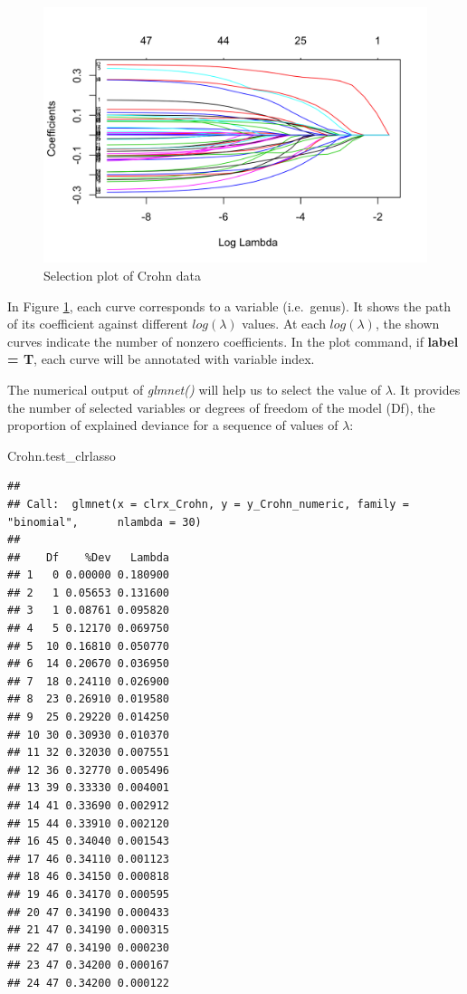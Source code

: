 \documentclass[openany]{book}
\newenvironment{Shaded}{\begin{snugshade}}{\end{snugshade}}
\newcommand{\NormalTok}[1]{#1}
\begin{document}
\begin{figure}

{\centering \includegraphics[width=1\linewidth]{./Generated_plots/CDlasso-1} 

}

\caption{Selection plot of Crohn data}\label{fig:CDlasso}
\end{figure}

In Figure \ref{fig:CDlasso}, each curve corresponds to a variable
(i.e.~genus). It shows the path of its coefficient against different
\(log(\lambda)\) values. At each \(log(\lambda)\), the shown curves
indicate the number of nonzero coefficients. In the plot command, if
\textbf{label = T}, each curve will be annotated with variable index.

The numerical output of \emph{glmnet()} will help us to select the value
of \(\lambda\). It provides the number of selected variables or degrees
of freedom of the model (Df), the proportion of explained deviance for a
sequence of values of \(\lambda\):

\begin{Shaded}
\begin{Highlighting}[]
\NormalTok{Crohn.test_clrlasso}
\end{Highlighting}
\end{Shaded}

\begin{verbatim}
## 
## Call:  glmnet(x = clrx_Crohn, y = y_Crohn_numeric, family = "binomial",      nlambda = 30) 
## 
##    Df    %Dev   Lambda
## 1   0 0.00000 0.180900
## 2   1 0.05653 0.131600
## 3   1 0.08761 0.095820
## 4   5 0.12170 0.069750
## 5  10 0.16810 0.050770
## 6  14 0.20670 0.036950
## 7  18 0.24110 0.026900
## 8  23 0.26910 0.019580
## 9  25 0.29220 0.014250
## 10 30 0.30930 0.010370
## 11 32 0.32030 0.007551
## 12 36 0.32770 0.005496
## 13 39 0.33330 0.004001
## 14 41 0.33690 0.002912
## 15 44 0.33910 0.002120
## 16 45 0.34040 0.001543
## 17 46 0.34110 0.001123
## 18 46 0.34150 0.000818
## 19 46 0.34170 0.000595
## 20 47 0.34190 0.000433
## 21 47 0.34190 0.000315
## 22 47 0.34190 0.000230
## 23 47 0.34200 0.000167
## 24 47 0.34200 0.000122
\end{verbatim}
\end{document}
